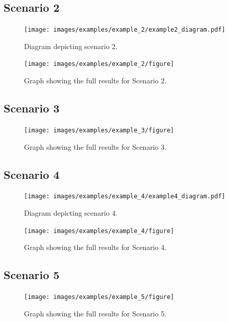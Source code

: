 \documentclass{l4proj}
\begin{document}
\clearpage
\subsection{Scenario 2}\label{apen:scen2}
\begin{figure}[h]
    \centering
    \texttt{[image: images/examples/example\_2/example2\_diagram.pdf]}
    ~
    \caption{Diagram depicting scenario 2.}
    \label{fig:example2_diagram}
\end{figure}
\begin{figure}[htbp]
    \centering
    \texttt{[image: images/examples/example\_2/figure]}
    ~
    \caption{Graph showing the full results for Scenario 2.}
    \label{fig:example2}
\end{figure}

\clearpage
\subsection{Scenario 3}\label{apen:scen3}
\begin{figure}[htbp]
    \centering
    \texttt{[image: images/examples/example\_3/figure]}
    ~
    \caption{Graph showing the full results for Scenario 3.}
    \label{fig:example3}
\end{figure}

\clearpage
\subsection{Scenario 4}\label{apen:scen4}
\begin{figure}[h]
    \centering
    \texttt{[image: images/examples/example\_4/example4\_diagram.pdf]}
    ~
    \caption{Diagram depicting scenario 4.}
    \label{fig:example4_diagram}
\end{figure}
\begin{figure}[htbp]
    \centering
    \texttt{[image: images/examples/example\_4/figure]}
    ~
    \caption{Graph showing the full results for Scenario 4.}
    \label{fig:example4}
\end{figure}

\clearpage
\subsection{Scenario 5}\label{apen:scen5}

\begin{figure}[htbp]
    \centering
    \texttt{[image: images/examples/example\_5/figure]}
    ~
    \caption{Graph showing the full results for Scenario 5.}
    \label{fig:example5}
\end{figure}
\end{document}
